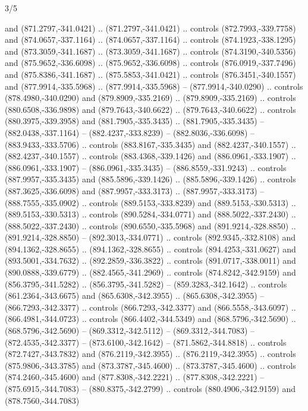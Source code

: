 \begin{flagdescription}{3/5}
\begin{scope}[xshift=0.5\flaglength,yshift=0.5\flagwidth,scale=\flagwidth/99]
\begin{scope}[y=0.8pt, x=0.8pt, yscale=-0.20628, xscale=0.20628,shift={(-500,-300)}]
\begin{scope}[cm={{0.79646,0.0,0.0,0.7753,(100.0721,273.79617)}}]
\begin{scope}[cm={{1.08438,0.0,0.0,1.08438,(-425.76596,333.57046)}}]
  and (871.2797,-341.0421) .. (871.2797,-341.0421) .. controls
  (872.7993,-339.7758) and (874.0657,-337.1164) .. (874.0657,-337.1164) ..
  controls (874.1923,-338.1295) and (873.3059,-341.1687) .. (873.3059,-341.1687)
  .. controls (874.3190,-340.5356) and (875.9652,-336.6098) ..
  (875.9652,-336.6098) .. controls (876.0919,-337.7496) and (875.8386,-341.1687)
  .. (875.5853,-341.0421) .. controls (876.3451,-340.1557) and
  (877.9914,-335.5968) .. (877.9914,-335.5968) -- (877.9914,-340.0290) ..
  controls (878.4980,-340.0290) and (879.8909,-335.2169) .. (879.8909,-335.2169)
  .. controls (880.6508,-336.9898) and (879.7643,-340.6622) ..
  (879.7643,-340.6622) .. controls (880.3975,-339.3958) and (881.7905,-335.3435)
  .. (881.7905,-335.3435) -- (882.0438,-337.1164) -- (882.4237,-333.8239) --
  (882.8036,-336.6098) -- (883.9433,-333.5706) .. controls (883.8167,-335.3435)
  and (882.4237,-340.1557) .. (882.4237,-340.1557) .. controls
  (883.4368,-339.1426) and (886.0961,-333.1907) .. (886.0961,-333.1907) --
  (886.0961,-335.3435) -- (886.8559,-331.9243) .. controls (887.9957,-335.3435)
  and (885.5896,-339.1426) .. (885.5896,-339.1426) .. controls
  (887.3625,-336.6098) and (887.9957,-333.3173) .. (887.9957,-333.3173) --
  (888.7555,-335.0902) .. controls (889.5153,-333.8239) and (889.5153,-330.5313)
  .. (889.5153,-330.5313) .. controls (890.5284,-334.0771) and
  (888.5022,-337.2430) .. (888.5022,-337.2430) .. controls (890.6550,-335.5968)
  and (891.9214,-328.8850) .. (891.9214,-328.8850) -- (892.3013,-334.0771) ..
  controls (892.9345,-332.8108) and (894.1362,-328.8655) .. (894.1362,-328.8655)
  .. controls (894.4253,-331.0627) and (893.5001,-334.7632) ..
  (892.2859,-336.3822) .. controls (891.0717,-338.0011) and (890.0888,-339.6779)
  .. (882.4565,-341.2969) .. controls (874.8242,-342.9159) and
  (856.3795,-341.5282) .. (856.3795,-341.5282) -- (859.3283,-342.1642) ..
  controls (861.2364,-343.6675) and (865.6308,-342.3955) .. (865.6308,-342.3955)
  -- (866.7293,-342.3377) .. controls (866.7293,-342.3377) and
  (866.5558,-343.6097) .. (866.4981,-344.0723) .. controls (866.4402,-344.5349)
  and (868.5796,-342.5690) .. (868.5796,-342.5690) -- (869.3312,-342.5112) --
  (869.3312,-344.7083) -- (872.4535,-342.3377) -- (873.6100,-342.1642) --
  (871.5862,-344.8818) .. controls (872.7427,-343.7832) and (876.2119,-342.3955)
  .. (876.2119,-342.3955) .. controls (875.9806,-343.3785) and
  (873.3787,-345.4600) .. (873.3787,-345.4600) .. controls (874.2460,-345.4600)
  and (877.8308,-342.2221) .. (877.8308,-342.2221) -- (875.6915,-344.7083) --
  (880.8375,-342.2799) .. controls (880.4906,-342.9159) and (878.7560,-344.7083)

\end{scope}
\end{scope}
\end{scope}
\end{scope}
\end{flagdescription}
